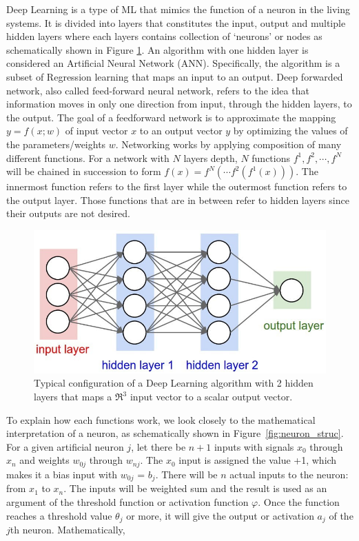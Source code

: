 Deep Learning is a type of ML that mimics the function of a
neuron in the living systems. It is divided into layers that constitutes the
input, output and multiple hidden layers where each layers contains collection
of
`neurons' or nodes as schematically shown in Figure \ref{fig:DL}. An algorithm
with one
hidden layer is
considered an Artificial Neural Network (ANN). Specifically, the algorithm is a
subset of Regression learning that maps an input to an output. Deep forwarded
network, also called
feed-forward neural network, refers to the idea that information moves in only
one direction from input, through the hidden layers,  to the output.  The goal
of a feedforward network is to approximate the mapping $y = f(x; w)$ of input
vector $x$ to an output vector $y$ by optimizing the values of the
parameters/weights $w$. Networking works by applying composition of many
different
functions. For a network with  $N$ layers depth, $N$ functions $f^1, f^2,
    \cdots, f^N$ will be
chained in succession to form $f(x) = f^N(\cdots f^2(f^1(x)))$. The innermost
function
refers to the first layer while the outermost function refers to the output
layer. Those functions that are in between refer to hidden layers since their
outputs are not desired.

\begin{figure}[h!]
    \centering
    \includegraphics[width=0.5\linewidth]{images/DL.png}
    \caption{Typical configuration of a Deep Learning algorithm with 2 hidden
        layers that maps a $\mathfrak{R}^3$ input vector to a scalar output
        vector.}
    \label{fig:DL}
\end{figure}

To explain how each functions work, we look closely to the mathematical
interpretation of a neuron, as schematically shown in
Figure~\ref{fig:neuron_struc}. For a given artificial neuron $j$, let there be
$n+1$ inputs with signals $x_0$ through $x_n$ and weights $w_{0j}$ through
$w_{nj}$. The $x_0$ input is assigned the value +1, which makes it a bias input
with $w_{0j}$ = $b_j$. There will be $n$ actual inputs to the neuron: from
$x_1$ to $x_n$. The inputs will be weighted sum and the result is used as an
argument of the threshold function or activation function $\varphi$. Once the
function reaches a threshold value $\theta_j$ or more, it will give the output
or activation $a_j$ of the  $j$th neuron. Mathematically,


